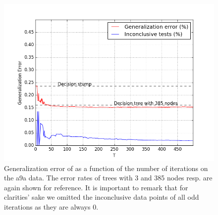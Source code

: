 \begin{figure}[!ht]
  \centering
    \includegraphics[width=\graphWidth]{generated/SQSVM.png}
  \caption{Generalization error of \squintB as a function of the number of iterations on the a9a data. The error rates of trees with 3 and 385 nodes resp. are again shown for reference. It is important to remark that for clarities' sake we omitted the inconclusive data points of all odd iterations as they are always 0.}
      \label{fig:SQSVM}
\end{figure}
\FloatBarrier
